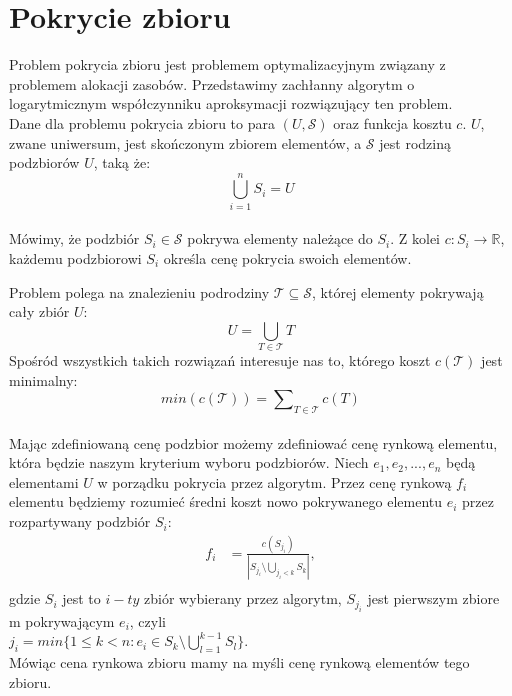 \section{Pokrycie zbioru}

Problem pokrycia zbioru jest problemem optymalizacyjnym związany z problemem alokacji zasobów. 
Przedstawimy zachłanny algorytm o logarytmicznym współczynniku aproksymacji rozwiązujący ten problem.\\


Dane dla problemu pokrycia zbioru to para $(U,\mathcal{S})$ oraz funkcja kosztu $c$. $U$, zwane uniwersum, jest skończonym zbiorem elementów, a $\mathcal{S}$ jest rodziną podzbiorów $U$, taką że:\\
\[ \bigcup\limits_{i=1}^{n} S_{i} = U \] \\
Mówimy, że podzbiór $S_{i} \in \mathcal{S}$ pokrywa elementy należące do $S_{i}$. 
Z kolei $c: S_{i} \rightarrow \mathbb{R} $, każdemu podzbiorowi $S_{i}$ określa cenę pokrycia swoich elementów.

Problem polega na znalezieniu podrodziny $\mathcal{T} \subseteq \mathcal{S}$, której elementy pokrywają cały zbiór $U$:
\[ U = \bigcup_{T \in \mathcal{T}} T \]  
Spośród wszystkich takich rozwiązań interesuje nas to, którego koszt $c(\mathcal{T})$ jest minimalny: \[ min(c(\mathcal{T})) = \sum\nolimits_{T \in \mathcal{T}} c(T) \]  \\


Mając zdefiniowaną cenę podzbior możemy zdefiniować cenę rynkową elementu, która będzie naszym kryterium wyboru podzbiorów.
Niech $e_{1}, e_{2}, ... , e_{n}$ będą elementami $U$ w porządku pokrycia przez algorytm.
Przez cenę rynkową $f_{i}$ elementu będziemy rozumieć średni koszt nowo pokrywanego elementu $e_{i}$ przez rozpartywany podzbiór $S_{i}$: \\
\begin{align*}
f_{i} &= \frac{c(S_{j_i})}{\left|S_{j_i} \setminus \bigcup_{j_{i} < k} S_{k} \right|},\\
\end{align*}
gdzie $S_{i}$ jest to $i-ty$ zbiór wybierany przez algorytm, $S_{j_i}$ jest pierwszym zbiore m pokrywającym $e_{i}$, czyli\\ $j_{i} = min \bigg\{ 1 \leq k < n : e_i \in S_k \setminus \bigcup\limits_{l=1}^{k-1} S_{l}  \bigg\}$.\\
Mówiąc cena rynkowa zbioru mamy na myśli cenę rynkową elementów tego zbioru.\\


